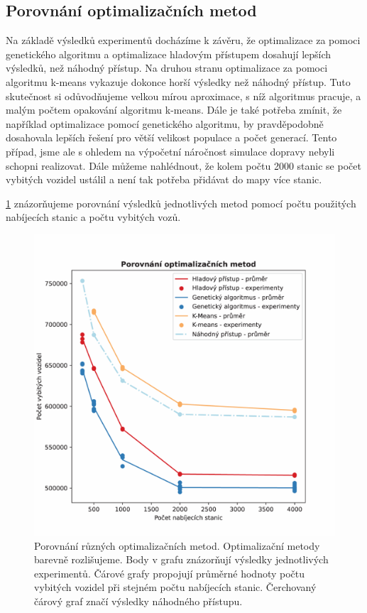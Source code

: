 \subsection{Porovnání optimalizačních metod}

Na základě výsledků experimentů docházíme k závěru, že optimalizace za pomoci
genetického algoritmu a optimalizace hladovým přístupem dosahují lepších výsledků,
než náhodný přístup. Na druhou stranu optimalizace za pomoci algoritmu k-means
vykazuje dokonce horší výsledky než náhodný přístup. Tuto skutečnost si odůvodňujeme
velkou mírou aproximace, s níž algoritmus pracuje, a malým počtem opakování algoritmu
k-means. Dále je také potřeba zmínit, že například optimalizace pomocí genetického
algoritmu, by pravděpodobně dosahovala lepších řešení pro větší velikost populace
a počet generací. Tento případ, jsme ale s ohledem na výpočetní náročnost simulace
dopravy nebyli schopni realizovat. Dále můžeme nahlédnout, že kolem počtu 2000 stanic
se počet vybitých vozidel ustálil a není tak potřeba přidávat do mapy více stanic.

\cref{fig:porovnani_optimalizaci} znázorňujeme 
porovnání výsledků jednotlivých metod pomocí počtu použitých nabíjecích stanic a 
počtu vybitých vozů.


\begin{figure}
    \centering
    \includegraphics[width=1\linewidth]{img/pdfa-optim_compare.pdf}
    \caption{Porovnání různých optimalizačních metod. Optimalizační metody barevně
    rozlišujeme. Body v grafu znázorňují výsledky jednotlivých experimentů. Čárové
    grafy propojují průměrné hodnoty počtu vybitých vozidel při stejném počtu
    nabíjecích stanic. Čerchovaný čárový graf značí výsledky náhodného přístupu.}
    \label{fig:porovnani_optimalizaci}
\end{figure}



